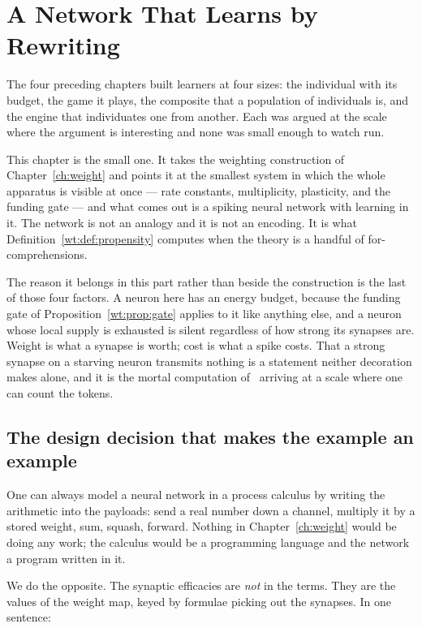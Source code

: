 \chapter{A Network That Learns by Rewriting}
\label{ch:spiking}

The four preceding chapters built learners at four sizes: the individual with its
budget, the game it plays, the composite that a population of individuals is, and the
engine that individuates one from another. Each was argued at the scale where the
argument is interesting and none was small enough to watch run.

This chapter is the small one. It takes the weighting construction of
Chapter~\ref{ch:weight} and points it at the smallest system in which the whole
apparatus is visible at once --- rate constants, multiplicity, plasticity, and the
funding gate --- and what comes out is a spiking neural network with learning in it. The
network is not an analogy and it is not an encoding. It is what
Definition~\ref{wt:def:propensity} computes when the theory is a handful of
for-comprehensions.

The reason it belongs in this part rather than beside the construction is the last of
those four factors. A neuron here has an energy budget, because the funding gate of
Proposition~\ref{wt:prop:gate} applies to it like anything else, and a neuron whose local
supply is exhausted is silent regardless of how strong its synapses are. Weight is what a
synapse is worth; cost is what a spike costs. That a strong synapse on a starving neuron
transmits nothing is a statement neither decoration makes alone, and it is the mortal
computation of \chSci\ arriving at a scale where one can count the tokens.

\section{The design decision that makes the example an example}

One can always model a neural network in a process calculus by writing the arithmetic
into the payloads: send a real number down a channel, multiply it by a stored weight,
sum, squash, forward. Nothing in Chapter~\ref{ch:weight} would be doing any work; the
calculus would be a programming language and the network a program written in it.

We do the opposite. The synaptic efficacies are \emph{not} in the terms. They are the
values of the weight map, keyed by formulae picking out the synapses. In one sentence:

